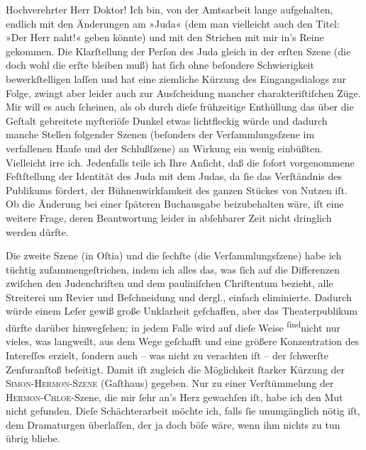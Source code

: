 \pstart\center{}Hochverehrter Herr Doktor!\pend\vspace{0.5em}
\pstart
           Ich bin, von der Amtsarbeit lange aufgehalten, endlich mit den Änderungen am »Juda« (dem man vielleicht auch den Titel: »Der
               Herr naht!« geben könnte) und mit den Strichen mit mir in’s Reine gekommen. Die
               Klarſtellung der Perſon des Juda gleich in der erſten Szene (die doch wohl die erſte
               bleiben muß) hat{ }ſich ohne beſondere Schwierigkeit bewerkſtelligen laſſen und hat
               eine ziemliche Kürzung des Eingangsdialogs zur Folge, zwingt aber leider auch zur
               Ausſcheidung mancher charakteriſtiſchen Züge. Mir will es auch{ }ſcheinen,  als ob durch dieſe frühzeitige Enthüllung das über
               die Geſtalt gebreitete myſteriöſe Dunkel etwas lichtfleckig würde und  dadurch manche Stellen folgender Szenen (beſonders
               der Verſammlungsſzene im verfallenen Hauſe und der Schlußſzene) {\pb}an Wirkung ein wenig einbüßten. Vielleicht
               irre ich. Jedenfalls teile ich Ihre Anſicht, daß die{ }ſofort vorgenommene Feſtſtellung
               der Identität des Juda mit dem Judas, da{ }ſie das Verſtändnis des Publikums fördert,
               der Bühnenwirkſamkeit des ganzen Stückes von Nutzen iſt. Ob die Änderung bei einer{ }ſpäteren Buchausgabe beizubehalten wäre, iſt eine weitere Frage, deren Beantwortung
               leider in abſehbarer Zeit nicht dringlich werden dürfte.\pend
           
\pstart
           Die zweite Szene (in Oſtia) und die{ }ſechſte (die
               Verſammlungsſzene) habe ich tüchtig zuſammengeſtrichen, indem ich alles das, was{ }ſich
               auf die Differenzen zwiſchen den Judenchriſten und dem pauliniſchen Chriſtentum
               bezieht, alle Streiterei um Revier und Beſchneidung und dergl., einfach eliminierte.
               Dadurch würde einem Leſer gewiß große Unklarheit geſchaffen, aber das Theaterpublikum
               dürfte darüber hinwegſehen; in jedem Falle wird auf dieſe Weise \substVorne{}\textsuperscript{ſind}\substDazwischen{}nicht\substHinten{} nur vieles, was langweilt, aus dem Wege geſchafft und eine größere
               Konzentration des Intereſſes erzielt,{ }ſondern auch – {\pb}was nicht zu verachten iſt – der{ }ſchwerſte
               Zenſuranſtoß beſeitigt. Damit iſt zugleich die Möglichkeit{ }ſtarker Kürzung der \textsc{Simon-Hermon-Szene} (Gaſthaus) gegeben. Nur zu einer
               Verſtümmelung der \textsc{Hermon-Chloe}-Szene, die mir{ }ſehr an’s
               Herz gewachſen iſt, habe ich den Mut nicht gefunden. Dieſe Schächterarbeit möchte
               ich, falls{ }ſie unumgänglich nötig iſt, dem Dramaturgen überlaſſen, der ja doch böſe
               wäre, wenn ihm nichts zu tun übrig bliebe.\pend
           

